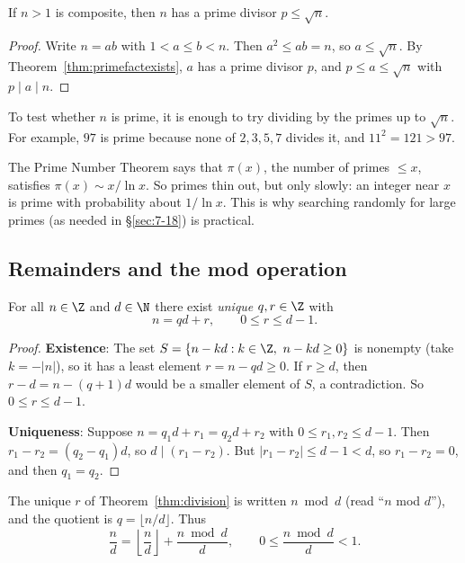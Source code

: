 \begin{proposition}
\label{thm:sqrtbound}
If $n>1$ is composite, then $n$ has a prime divisor $p\le\sqrt n$.
\end{proposition}
\begin{proof}
Write $n=ab$ with $1<a\le b<n$. Then $a^2\le ab=n$, so $a\le\sqrt n$. By Theorem~\ref{thm:primefactexists}, $a$ has a prime divisor $p$, and $p\le a\le\sqrt n$ with $p\mid a\mid n$.
\end{proof}

\begin{note}
To test whether $n$ is prime, it is enough to try dividing by the primes up to $\sqrt n$. For example, $97$ is prime because none of $2,3,5,7$ divides it, and $11^2=121>97$.
\end{note}

\begin{note}
The Prime Number Theorem says that $\pi(x)$, the number of primes $\le x$, satisfies $\pi(x)\sim x/\ln x$. So primes thin out, but only slowly: an integer near $x$ is prime with probability about $1/\ln x$. This is why searching randomly for large primes (as needed in \S\ref{sec:7-18}) is practical.
\end{note}

\subsection{Remainders and the mod operation}
\label{sec:7-3}

\begin{theorem}
\label{thm:division}
For all $n\in\Z$ and $d\in\N$ there exist \emph{unique} $q,r\in\Z$ with
\[
n=qd+r, \qquad 0\le r\le d-1.
\]
\end{theorem}
\begin{proof}
\textbf{Existence}: The set $S=\{n-kd : k\in\Z,\ n-kd\ge0\}$ is nonempty (take $k=-|n|$), so it has a least element $r=n-qd\ge0$. If $r\ge d$, then $r-d=n-(q+1)d$ would be a smaller element of $S$, a contradiction. So $0\le r\le d-1$.

\textbf{Uniqueness}: Suppose $n=q_1d+r_1=q_2d+r_2$ with $0\le r_1,r_2\le d-1$. Then $r_1-r_2=(q_2-q_1)d$, so $d\mid(r_1-r_2)$. But $|r_1-r_2|\le d-1<d$, so $r_1-r_2=0$, and then $q_1=q_2$.
\end{proof}

\begin{definition}
The unique $r$ of Theorem~\ref{thm:division} is written $n\bmod d$ (read ``$n$ mod $d$''), and the quotient is $q=\lfloor n/d\rfloor$. Thus
\[
\frac nd = \left\lfloor\frac nd\right\rfloor + \frac{n\bmod d}{d}, \qquad 0\le\frac{n\bmod d}{d}<1.
\]
\end{definition}

